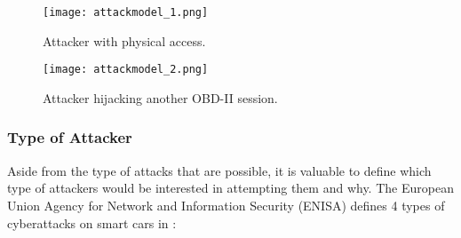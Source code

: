 \begin{figure}[h]
	\label{fig:attackmodel_1}
	\centering
	\texttt{[image: attackmodel\_1.png]}
	\caption{Attacker with physical access.}
\end{figure}

\begin{figure}[h]
	\label{fig:attackmodel_2}
	\centering
	\texttt{[image: attackmodel\_2.png]}
	\caption{Attacker hijacking another OBD-II session.}
\end{figure}

\subsubsection{Type of Attacker}
Aside from the type of attacks that are possible, it is valuable to define which type of attackers would be interested in attempting them and why. The European Union Agency for Network and Information Security (ENISA) defines 4 types of cyberattacks on smart cars in \cite{Enisa}: 

